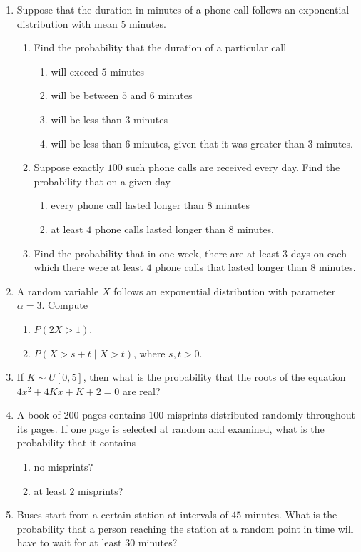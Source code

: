 \documentclass[svgnames]{amsart}
\begin{document}
\begin{enumerate}[leftmargin=*]
\item Suppose that the duration in minutes of a phone call follows an exponential distribution with mean $5$ minutes.
\begin{enumerate}
\item  Find the probability that the duration of a particular call
\begin{enumerate}
	\item will exceed $5$ minutes
	\item will be between $5$ and $6$ minutes
	\item will be less than $3$ minutes
	\item will be less than $6$ minutes, given that it was greater than $3$ minutes.
\end{enumerate}
\item Suppose exactly $100$ such phone calls are received every day. Find the probability that on a given day
\begin{enumerate}
	\item every phone call lasted longer than $8$ minutes
	\item at least $4$ phone calls lasted longer than $8$ minutes.
\end{enumerate}
\item Find the probability that in one week, there are at least $3$ days on each which there were at least $4$ phone calls that lasted longer than $8$ minutes.
\end{enumerate}

\item A random variable $X$ follows an exponential distribution with parameter $\alpha = 3$. Compute
\begin{enumerate}
	\item $P(2X > 1)$.
	\item $P(X > s + t \mid X > t)$, where $s, t > 0$.
\end{enumerate}

\item If $K \sim U[0, 5]$, then what is the probability that the roots of the equation $4x^2 + 4Kx + K + 2 = 0$ are real?

\item A book of $200$ pages contains $100$ misprints distributed randomly throughout its pages. If one page is selected at random and examined, what is the probability that it contains
\begin{enumerate}
	\item no misprints?
	\item at least $2$ misprints?
\end{enumerate}

\item Buses start from a certain station at intervals of $45$ minutes. What is the probability that a person reaching the station at a random point in time will have to wait for at least $30$ minutes?
\end{enumerate}
\end{document}
